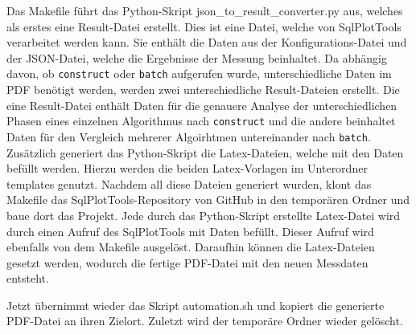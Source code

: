 Das Makefile führt das Python-Skript json\_to\_result\_converter.py aus, welches als erstes eine Result-Datei erstellt.
Dies ist eine Datei, welche von SqlPlotTools verarbeitet werden kann.
Sie enthält die Daten aus der Konfigurations-Datei und der JSON-Datei, welche die Ergebnisse der Messung beinhaltet.
Da abhängig davon, ob \texttt{construct} oder \texttt{batch} aufgerufen wurde, unterschiedliche Daten im PDF benötigt werden, werden zwei unterschiedliche Result-Dateien erstellt.
Die eine Result-Datei enthält Daten für die genauere Analyse der unterschiedlichen Phasen eines einzelnen Algorithmus nach \texttt{construct} und die andere beinhaltet Daten für den Vergleich mehrerer Algoirhtmen untereinander nach \texttt{batch}.
Zusätzlich generiert das Python-Skript die Latex-Dateien, welche mit den Daten befüllt werden. 
Hierzu werden die beiden Latex-Vorlagen im Unterordner templates genutzt.
Nachdem all diese Dateien generiert wurden, klont das Makefile das SqlPlotTools-Repository von GitHub in den temporären Ordner und baue dort das Projekt.
Jede durch das Python-Skript erstellte Latex-Datei wird durch einen Aufruf des SqlPlotTools mit Daten befüllt.
Dieser Aufruf wird ebenfalls von dem Makefile ausgelöst. 
Daraufhin können die Latex-Dateien gesetzt werden, wodurch die fertige PDF-Datei mit den neuen Messdaten entsteht. 

Jetzt übernimmt wieder das Skript automation.sh und kopiert die generierte PDF-Datei an ihren Zielort.
Zuletzt wird der temporäre Ordner wieder gelöscht.

